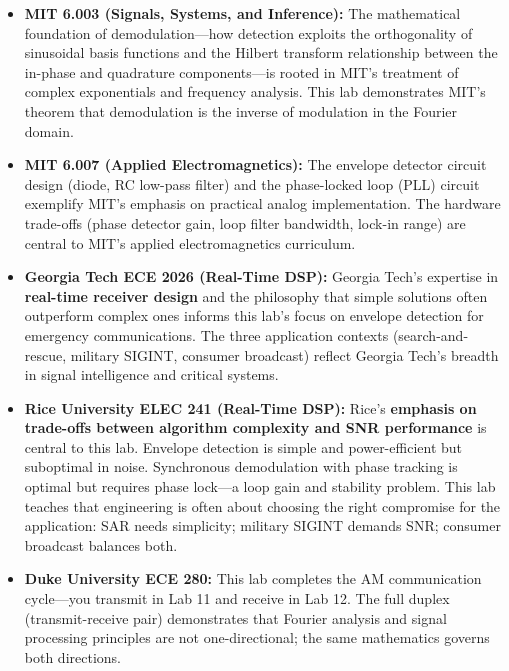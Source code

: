 \documentclass[11pt,letterpaper]{article}
\begin{document}
\begin{itemize}
    \item \textbf{MIT 6.003 (Signals, Systems, and Inference):} The mathematical foundation of demodulation—how detection exploits the orthogonality of sinusoidal basis functions and the Hilbert transform relationship between the in-phase and quadrature components—is rooted in MIT's treatment of complex exponentials and frequency analysis. This lab demonstrates MIT's theorem that demodulation is the inverse of modulation in the Fourier domain.

    \item \textbf{MIT 6.007 (Applied Electromagnetics):} The envelope detector circuit design (diode, RC low-pass filter) and the phase-locked loop (PLL) circuit exemplify MIT's emphasis on practical analog implementation. The hardware trade-offs (phase detector gain, loop filter bandwidth, lock-in range) are central to MIT's applied electromagnetics curriculum.

    \item \textbf{Georgia Tech ECE 2026 (Real-Time DSP):} Georgia Tech's expertise in \textbf{real-time receiver design} and the philosophy that simple solutions often outperform complex ones informs this lab's focus on envelope detection for emergency communications. The three application contexts (search-and-rescue, military SIGINT, consumer broadcast) reflect Georgia Tech's breadth in signal intelligence and critical systems.

    \item \textbf{Rice University ELEC 241 (Real-Time DSP):} Rice's \textbf{emphasis on trade-offs between algorithm complexity and SNR performance} is central to this lab. Envelope detection is simple and power-efficient but suboptimal in noise. Synchronous demodulation with phase tracking is optimal but requires phase lock—a loop gain and stability problem. This lab teaches that engineering is often about choosing the right compromise for the application: SAR needs simplicity; military SIGINT demands SNR; consumer broadcast balances both.

    \item \textbf{Duke University ECE 280:} This lab completes the AM communication cycle—you transmit in Lab 11 and receive in Lab 12. The full duplex (transmit-receive pair) demonstrates that Fourier analysis and signal processing principles are not one-directional; the same mathematics governs both directions.
\end{itemize}
\end{document}
